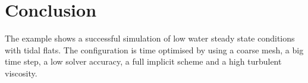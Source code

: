 \section{Conclusion}
The example shows a successful simulation of low water steady state conditions
with tidal flats.
The configuration is time optimised by using a coarse mesh, a big time step,
a low solver accuracy, a full implicit scheme and a high turbulent viscosity.





